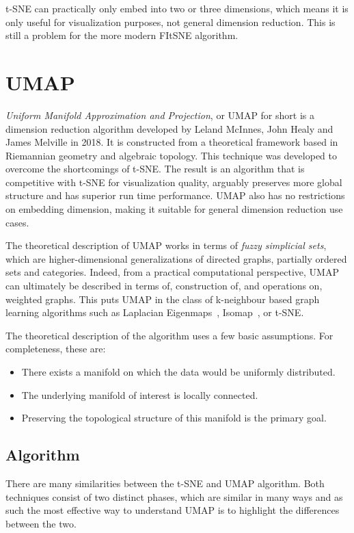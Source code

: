 t-SNE can practically only embed into two or three dimensions, which means it is only useful for visualization purposes, not general dimension reduction. This is still a problem for the more modern FItSNE algorithm.

\section{UMAP}\label{sec:umap}

\textit{Uniform Manifold Approximation and Projection}\cite{bib:umap}, or UMAP for short is a dimension reduction algorithm developed by Leland McInnes, John Healy and James Melville in 2018. It is constructed from a theoretical framework based in Riemannian geometry and algebraic topology. This technique was developed to overcome the shortcomings of t-SNE. The result is an algorithm that is competitive with t-SNE for visualization quality, arguably preserves more global structure and has superior run time performance. UMAP also has no restrictions on embedding dimension, making it suitable for general dimension reduction use cases.

The theoretical description of UMAP works in terms of \textit{fuzzy simplicial sets}, which are higher-dimensional generalizations of directed graphs, partially ordered sets and categories. Indeed, from a practical computational perspective, UMAP can ultimately be described in terms of, construction of, and operations on, weighted graphs. This puts UMAP in the class of k-neighbour based graph learning algorithms such as Laplacian Eigenmaps~\cite{bib:laplacian_eigenmaps}, Isomap~\cite{bib:isomap}, or t-SNE.

The theoretical description of the algorithm uses a few basic assumptions. For completeness, these are:

\begin{itemize}
	\item There exists a manifold on which the data would be uniformly distributed.
	\item The underlying manifold of interest is locally connected.
	\item Preserving the topological structure of this manifold is the primary goal.
\end{itemize}

\subsection{Algorithm}

There are many similarities between the t-SNE and UMAP algorithm. Both techniques consist of two distinct phases, which are similar in many ways and as such the most effective way to understand UMAP is to highlight the differences between the two.

